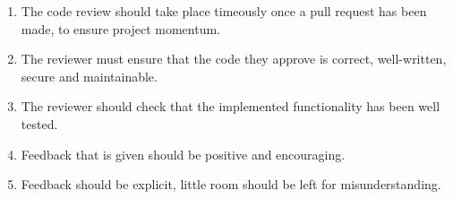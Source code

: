 \documentclass[10pt,onecolumn]{witseiepaper}
\begin{document}
\begin{enumerate}
	\item The code review should take place timeously once a pull request has been made, to ensure project momentum.
	\item The reviewer must ensure that the code they approve is correct, well-written, secure and maintainable.
	\item The reviewer should check that the implemented functionality has been well tested.
	\item Feedback that is given should be positive and encouraging.
	\item Feedback should be explicit, little room should be left for misunderstanding.
	
	
\end{enumerate}
\end{document}
